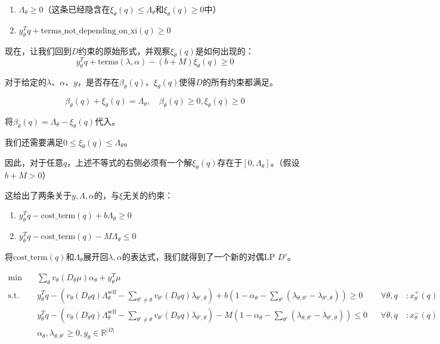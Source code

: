 \begin{enumerate}
    \item $\Lambda_\theta\geq 0$（这条已经隐含在$\xi_\theta(q)\leq \Lambda_\theta$和$\xi_\theta(q)\geq 0$中）
    \item $y_{\theta}^T q + \text{terms\_not\_depending\_on\_xi}(q)\geq 0$
\end{enumerate}

现在，让我们回到$D$约束的原始形式，并观察$\xi_\theta(q)$是如何出现的：
$$y_{\theta}^T q + \text{terms}(\lambda,\alpha)-(b+M)\xi_{\theta}(q) \geq 0$$

对于给定的$\lambda$、$\alpha$、$y$，是否存在$\beta_\theta(q)$、$\xi_\theta(q)$使得$D$的所有约束都满足。

$$\beta_\theta(q) + \xi_\theta(q) = \Lambda_\theta,\quad \beta_\theta(q)\geq 0, \xi_\theta(q)\geq 0$$

将$\beta_\theta(q)=\Lambda_\theta - \xi_\theta(q)$代入。

我们还需要满足$0\leq \xi_\theta(q) \leq \Lambda_\theta$。

因此，对于任意$q$，上述不等式的右侧必须有一个解$\xi_\theta(q)$存在于$[0,\Lambda_\theta]$。（假设$b+M>0$）

这给出了两条关于$y,\Lambda,\alpha$的，与$\xi$无关的约束：

\begin{enumerate}
    \item $y_{\theta}^T q - \text{cost\_term}(q) + b \Lambda_\theta \geq 0$
    \item $y_{\theta}^T q - \text{cost\_term}(q) - M \Lambda_\theta \leq 0$
\end{enumerate}

将$\text{cost\_term}(q)$和$\Lambda_\theta$展开回$\lambda,\alpha$的表达式，我们就得到了一个新的对偶LP $D'$。

\begin{align*}
    \min \quad & \sum_{\theta} v_{\theta}(D_{\theta}\mu)\alpha_{\theta} + y_{\theta}^{T}\mu \\
    \text{s.t.} \quad & y_{\theta}^{T}q - \left(v_{\theta}(D_{\theta}q)\Lambda_{\theta}^{\text{self}} - \sum_{\theta' \neq \theta} v_{\theta'}(D_{\theta}q)\lambda_{\theta', \theta}\right) + b\left(1 - \alpha_{\theta} - \sum_{\theta'} (\lambda_{\theta, \theta'} - \lambda_{\theta', \theta})\right) \geq 0 && \forall \theta, q \quad : x_{\theta}^{+}(q) \\
    & y_{\theta}^{T}q - \left(v_{\theta}(D_{\theta}q)\Lambda_{\theta}^{\text{self}} - \sum_{\theta' \neq \theta} v_{\theta'}(D_{\theta}q)\lambda_{\theta', \theta}\right) - M\left(1 - \alpha_{\theta} - \sum_{\theta'} (\lambda_{\theta, \theta'} - \lambda_{\theta', \theta})\right) \leq 0 && \forall \theta, q \quad : x_{\theta}^{-}(q) \\
    & \alpha_{\theta}, \lambda_{\theta, \theta'} \geq 0, y_{\theta} \in \mathbb{R}^{|\Omega|}
\end{align*}

